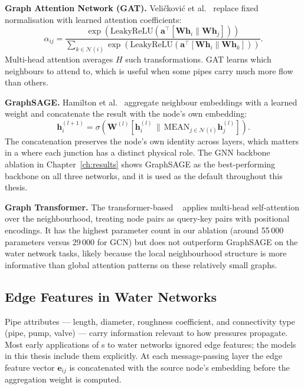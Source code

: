 \textbf{Graph Attention Network (GAT).} Veli{\v{c}}kovi{\'c}
et al.~\cite{velickovic2018graph} replace fixed normalisation with
learned attention coefficients:
\begin{equation}
  \alpha_{ij} = \frac{\exp\!\left(\text{LeakyReLU}\!\left(
    \mathbf{a}^\top[\mathbf{W}\mathbf{h}_i \| \mathbf{W}\mathbf{h}_j]
    \right)\right)}{\sum_{k \in \mathcal{N}(i)}
    \exp\!\left(\text{LeakyReLU}\!\left(
    \mathbf{a}^\top[\mathbf{W}\mathbf{h}_i \| \mathbf{W}\mathbf{h}_k]
    \right)\right)}.
\end{equation}
Multi-head attention averages $H$ such transformations. GAT
learns which neighbours to attend to, which is useful when some pipes
carry much more flow than others.

\textbf{GraphSAGE.} Hamilton et al.~\cite{hamilton2017inductive}
aggregate neighbour embeddings with a learned weight and concatenate
the result with the node's own embedding:
\begin{equation}
  \mathbf{h}_i^{(l+1)} = \sigma\!\left(\mathbf{W}^{(l)}\!\left[
    \mathbf{h}_i^{(l)} \,\big\|\, \text{MEAN}_{j \in \mathcal{N}(i)}
    \mathbf{h}_j^{(l)}\right]\right).
\end{equation}
The concatenation preserves the node's own identity across layers, which
matters in a \wdn{} where each junction has a distinct physical role.
The GNN backbone ablation in Chapter~\ref{ch:results} shows
GraphSAGE as the best-performing backbone on all three networks,
and it is used as the default throughout this thesis.

\textbf{Graph Transformer.} The transformer-based \gnn{}~\cite{shi2021masked}
applies multi-head self-attention over the neighbourhood, treating
node pairs as query-key pairs with positional encodings. It has the
highest parameter count in our ablation (around 55\,000 parameters
versus 29\,000 for GCN) but does not outperform
GraphSAGE on the water network tasks, likely because the local
neighbourhood structure is more informative than global attention
patterns on these relatively small graphs.

\subsection{Edge Features in Water Networks}

Pipe attributes — length, diameter, roughness coefficient, and
connectivity type (pipe, pump, valve) — carry information relevant
to how pressures propagate. Most early applications of \gnn{}s to
water networks ignored edge features; the models in this thesis
include them explicitly. At each message-passing layer the edge
feature vector $\mathbf{e}_{ij}$ is concatenated with the source
node's embedding before the aggregation weight is computed.

